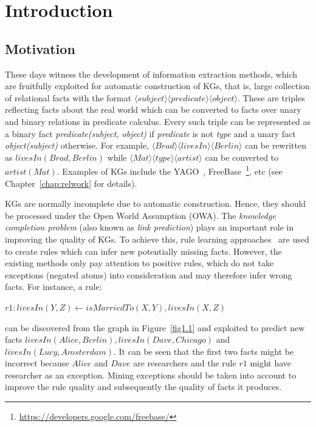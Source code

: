 \chapter{Introduction}
\label{chap:intro}

\section{Motivation}
\label{chap:motivation}

These days witness the development of information extraction methods, which are fruitfully exploited for automatic construction of KGs, that is, large collection of relational facts with the format $\langle subject \rangle \langle predicate \rangle \langle object \rangle$. These are triples reflecting facts about the real world which can be converted to facts over unary and binary relations in predicate calculus. Every such triple can be represented as a binary fact \textit{predicate(subject, object)} if \textit{predicate} is not \textit{type} and a unary fact \textit{object(subject)} otherwise. For example, $\langle Brad \rangle \langle livesIn \rangle \langle Berlin \rangle$ can be rewritten as $livesIn(Brad, Berlin)$ while $\langle Mat \rangle \langle type \rangle \langle artist \rangle$ can be converted to $artist(Mat)$. Examples of KGs include the YAGO~\cite{ref28}, FreeBase~\footnote{\url{https://developers.google.com/freebase/}}, etc (see Chapter~\ref{chap:relwork} for details).

KGs are normally incomplete due to automatic construction. Hence, they should be processed under the Open World Assumption (OWA). The \textit{knowledge completion problem} (also known as \textit{link prediction}) plays an important role in improving the quality of KGs. To achieve this, rule learning approaches~\cite{ref39, ref10} are used to create rules which can infer new potentially missing facts. However, the existing methods only pay attention to positive rules, which do not take exceptions (negated atoms) into consideration and may therefore infer wrong facts. For instance, a rule:

\begin{center}
$r1: livesIn(Y,Z) \leftarrow isMarriedTo(X,Y), livesIn(X,Z)$
\end{center}

can be discovered from the graph in Figure~\ref{fig1.1} and exploited to predict new facts $livesIn(Alice, Berlin), livesIn(Dave, Chicago)$ and $livesIn(Lucy, Amsterdam)$. It can be seen that the first two facts might be incorrect because $Alice$ and $Dave$ are researchers and the rule $r1$ might have researcher as an exception. Mining exceptions should be taken into account to improve the rule quality and subsequently the quality of facts it produces.

